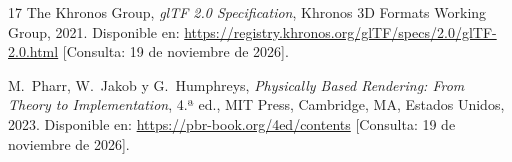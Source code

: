 \begin{thebibliography}{17}
 The Khronos Group, \textit{glTF 2.0 Specification}, Khronos 3D Formats Working Group, 2021. Disponible en: \url{https://registry.khronos.org/glTF/specs/2.0/glTF-2.0.html} [Consulta: 19 de noviembre de 2026].

 M.~Pharr, W.~Jakob y G.~Humphreys, \textit{Physically Based Rendering: From Theory to Implementation}, 4.ª ed., MIT Press, Cambridge, MA, Estados Unidos, 2023. Disponible en: \url{https://pbr-book.org/4ed/contents} [Consulta: 19 de noviembre de 2026].

\end{thebibliography}
\endgroup

